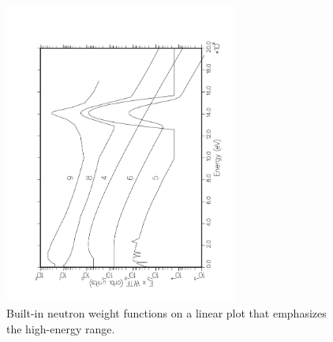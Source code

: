 \begin{figure}[t]\centering
\includegraphics[keepaspectratio, height=3.9in, angle=270]{figs/appb2ack}
\caption[GROUPR weight functions on a linear energy scale]{Built-in neutron
 weight functions on a linear plot that emphasizes the high-energy range.}
\label{fig-lin}
\end{figure}

